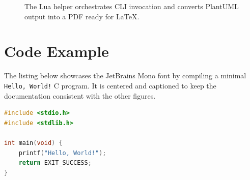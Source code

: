 \documentclass[12pt]{article}
\begin{document}
\begin{figure}[h]
  \centering
  \caption{The Lua helper orchestrates CLI invocation and converts PlantUML output into a PDF ready for \LaTeX.}
\end{figure}

\section{Code Example}
The listing below showcases the JetBrains Mono font by compiling a minimal \lstinline|Hello, World!| C program. It is centered and captioned to keep the documentation consistent with the other figures.

\begin{singlespacing}
    \begin{lstlisting}[language=C, caption={Minimal C program demonstrating the embedded code listing font.}]
#include <stdio.h>
#include <stdlib.h>

int main(void) {
    printf("Hello, World!");
    return EXIT_SUCCESS;
}\end{lstlisting}
\end{singlespacing}
\end{document}

